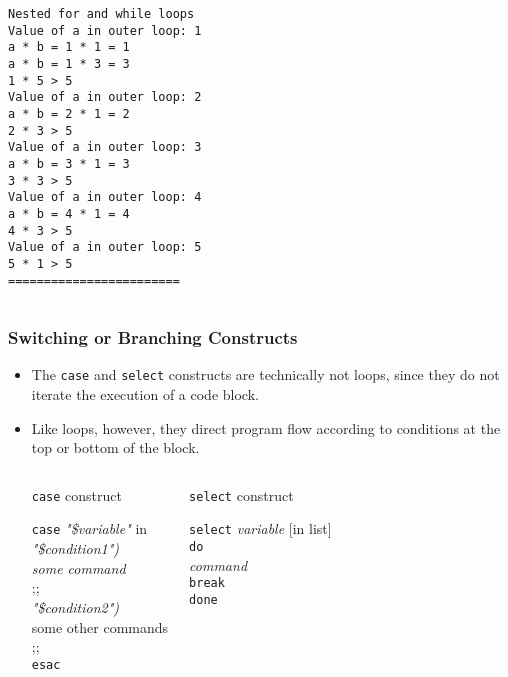 \documentclass[slidestop,mathserif,compress,xcolor=svgnames]{beamer}
\newenvironment{bblock}[0]
{
\begin{beamerboxesrounded}[upper=uppercol1,lower=lowercol1,shadow=true]}
{\end{beamerboxesrounded}}
\newenvironment{eblock}[0]
{
\begin{beamerboxesrounded}[upper=uppercol2,lower=lowercol2,shadow=true]}
{\end{beamerboxesrounded}}
\begin{document}
\begin{frame}
{\begin{columns}
\begin{bblock}{}
\begin{verbatim}
Nested for and while loops
Value of a in outer loop: 1
a * b = 1 * 1 = 1
a * b = 1 * 3 = 3
1 * 5 > 5
Value of a in outer loop: 2
a * b = 2 * 1 = 2
2 * 3 > 5
Value of a in outer loop: 3
a * b = 3 * 1 = 3
3 * 3 > 5
Value of a in outer loop: 4
a * b = 4 * 1 = 4
4 * 3 > 5
Value of a in outer loop: 5
5 * 1 > 5
========================
        \end{verbatim}
      \end{bblock}
    \end{columns}
  }
\end{frame}

\begin{frame}
  \frametitle{\small Switching or Branching Constructs}
  \begin{itemize}
    \item The \texttt{case} and \texttt{select} constructs are technically not loops, since they do not iterate the execution of a code block. 
    \item Like loops, however, they direct program flow according to conditions at the top or bottom of the block.
    \begin{columns}
      \column{5cm}
      \begin{eblock}{\texttt{case} construct}
        \begin{tabbing}
          \texttt{case} \=\textit{"\$variable"} in\\
          \>\textit{"\$condition1")}\\
          \>\textit{some command}\\
          \>;;\\
          \>\textit{"\$condition2")}\\
          \>some other commands\\
          \>;;\\
          \texttt{esac}
        \end{tabbing}
      \end{eblock}
      \column{5cm}
      \begin{eblock}{\texttt{select} construct}
        \begin{tabbing}
          \texttt{select} \=\textit{variable} [in list]\\
          \texttt{do}\\
          \>\textit{command}\\
          \>\texttt{break}\\
          \texttt{done}
        \end{tabbing}

\end{eblock}
\end{columns}
\end{itemize}
\end{frame}
\end{document}
